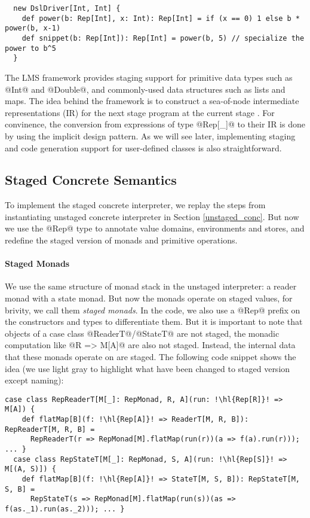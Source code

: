 \begin{lstlisting}
  new DslDriver[Int, Int] {
    def power(b: Rep[Int], x: Int): Rep[Int] = if (x == 0) 1 else b * power(b, x-1)
    def snippet(b: Rep[Int]): Rep[Int] = power(b, 5) // specialize the power to b^5
  }
\end{lstlisting}

The LMS framework provides staging support for primitive data types such as
@Int@ and @Double@, and commonly-used data structures such as lists and maps.
The idea behind the framework is to construct a sea-of-node intermediate
representations (IR) for the next stage program at the current stage
\cite{DBLP:conf/birthday/Rompf16}. For convinence, the conversion from
expressions of type @Rep[_]@ to their IR is done by using the implicit design
pattern. As we will see later, implementing staging and code generation
support for user-defined classes is also straightforward.

\subsection{Staged Concrete Semantics}

To implement the staged concrete interpreter, we replay the steps from
instantiating unstaged concrete interpreter in Section \ref{unstaged_conc}.
But now we use the @Rep@ type to annotate value domains, environments and
stores, and redefine the staged version of monads and primitive operations.

\paragraph{Staged Monads}
We use the same structure of monad stack in the unstaged interpreter: a reader
monad with a state monad. But now the monads operate on staged values, for
brivity, we call them \textit{staged monads}. In the code, we also use a @Rep@
prefix on the constructors and types to differentiate them. But it is important
to note that objects of a case class @ReaderT@/@StateT@ are not staged, the
monadic computation like @R => M[A]@ are also not staged. Instead, the internal
data that these monads operate on are staged. The following code snippet shows
the idea (we use light gray to highlight what have been changed to staged
version except naming):

\begin{lstlisting}[escapechar=!]
  case class RepReaderT[M[_]: RepMonad, R, A](run: !\hl{Rep[R]}! => M[A]) {
    def flatMap[B](f: !\hl{Rep[A]}! => ReaderT[M, R, B]): RepReaderT[M, R, B] =
      RepReaderT(r => RepMonad[M].flatMap(run(r))(a => f(a).run(r))); ... }
  case class RepStateT[M[_]: RepMonad, S, A](run: !\hl{Rep[S]}! => M[(A, S)]) {
    def flatMap[B](f: !\hl{Rep[A]}! => StateT[M, S, B]): RepStateT[M, S, B] =
      RepStateT(s => RepMonad[M].flatMap(run(s))(as => f(as._1).run(as._2))); ... }
\end{lstlisting}

